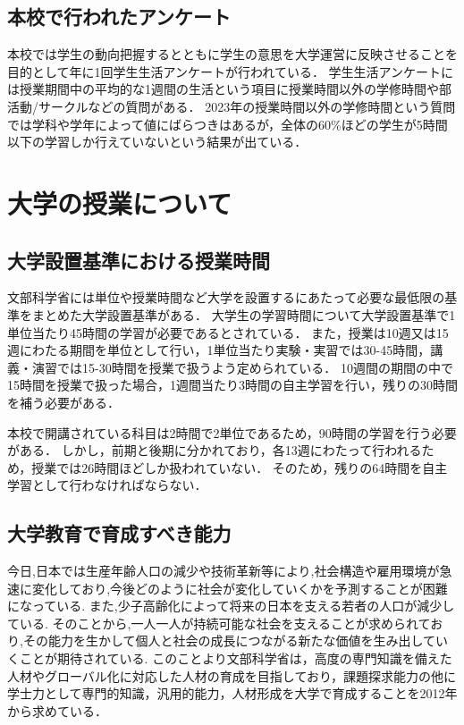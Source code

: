 \documentclass[12pt,a4j,titlepage]{ltjsarticle}
\begin{document}



\subsection{本校で行われたアンケート}
本校では学生の動向把握するとともに学生の意思を大学運営に反映させることを目的として年に1回学生生活アンケートが行われている．
学生生活アンケートには授業期間中の平均的な1週間の生活という項目に授業時間以外の学修時間や部活動/サークルなどの質問がある．
2023年の授業時間以外の学修時間という質問では学科や学年によって値にばらつきはあるが，全体の60\%ほどの学生が5時間以下の学習しか行えていないという結果が出ている\cite{unv2023}．

\clearpage

\section{大学の授業について}
\subsection{大学設置基準における授業時間}
文部科学省には単位や授業時間など大学を設置するにあたって必要な最低限の基準をまとめた大学設置基準がある．
大学生の学習時間について大学設置基準で1単位当たり45時間の学習が必要であるとされている．
また，授業は10週又は15週にわたる期間を単位として行い，1単位当たり実験・実習では30-45時間，講義・演習では15-30時間を授業で扱うよう定められている．
10週間の期間の中で15時間を授業で扱った場合，1週間当たり3時間の自主学習を行い，残りの30時間を補う必要がある．

本校で開講されている科目は2時間で2単位であるため，90時間の学習を行う必要がある．
しかし，前期と後期に分かれており，各13週にわたって行われるため，授業では26時間ほどしか扱われていない．
そのため，残りの64時間を自主学習として行わなければならない．

\subsection{大学教育で育成すべき能力}
今日,日本では生産年齢人口の減少や技術革新等により,社会構造や雇用環境が急速に変化しており,今後どのように社会が変化していくかを予測することが困難になっている.
また,少子高齢化によって将来の日本を支える若者の人口が減少している.
そのことから,一人一人が持続可能な社会を支えることが求められており,その能力を生かして個人と社会の成長につながる新たな価値を生み出していくことが期待されている.
このことより文部科学省は，高度の専門知識を備えた人材やグローバル化に対応した人材の育成を目指しており，課題探求能力の他に学士力として専門的知識，汎用的能力，人材形成を大学で育成することを2012年から求めている．
\end{document}
